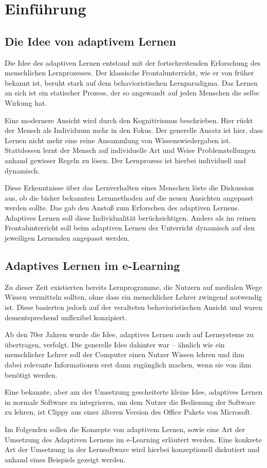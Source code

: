 \chapter{Einführung}

\section{Die Idee von adaptivem Lernen}
Die Idee des adaptiven Lernen entstand mit der fortschreitenden
Erforschung des menschlichen Lernprozesses.
Der klassische Frontalunterricht, wie er von früher bekannt ist,
beruht stark auf dem behavioristischen Lernparadigma.
Das Lernen an sich ist ein statischer Prozess, der so angewandt
auf jeden Menschen die selbe Wirkung hat.

Eine modernere Ansicht wird durch den Kognitivismus
beschrieben. Hier rückt der Mensch als Individuum mehr in den Fokus.
Der generelle Ansatz ist hier, dass Lernen nicht mehr eine reine
Ansammlung von Wissenswiedergaben ist. Stattdessen lernt der Mensch
auf individuelle Art und Weise Problemstellungen anhand gewisser Regeln zu lösen.
Der Lernprozess ist hierbei individuell und dynamisch.

Diese Erkenntnisse über das Lernverhalten eines Menschen löste die Diskussion aus,
ob die bisher bekannten Lernmethoden auf die neuen Ansichten angepasst werden sollte.
Das gab den Anstoß zum Erforschen des adaptiven Lernens.
Adaptives Lernen soll diese Individualität berücksichtigen.
Anders als im reinen Frontalunterricht soll beim adaptiven Lernen
der Unterricht dynamisch auf den jeweiligen Lernenden angepasst werden.

\section{Adaptives Lernen im e-Learning}
Zu dieser Zeit existierten bereits Lernprogramme, die Nutzern
auf medialen Wege Wissen vermitteln sollten, ohne dass ein menschlicher Lehrer
zwingend notwendig ist. Diese basierten jedoch auf der veralteten behavioristischen
Ansicht und waren dementsprechend unflexibel konzipiert.

Ab den 70er Jahren wurde die Idee, adaptives Lernen auch auf Lernsysteme
zu übertragen, verfolgt. Die generelle Idee dahinter war -- ähnlich wie ein
menschlicher Lehrer soll der Computer einen Nutzer Wissen lehren und
ihm dabei relevante Informationen erst dann zugänglich machen, wenn sie von ihm
benötigt werden.

Eine bekannte, aber am der Umsetzung gescheiterte kleine Idee, adaptives Lernen
in normale Software zu integrieren, um dem Nutzer die Bedienung der Software zu lehren,
ist \glqq Clippy\grqq{} aus einer älteren Version des Office Pakets von Microsoft.

Im Folgenden sollen die Konzepte von adaptivem Lernen, sowie eine Art der
Umsetzung des Adaptiven Lernens im e-Learning erläutert werden.
Eine konkrete Art der Umsetzung in der Lernsoftware wird hierbei konzeptionell
diskutiert und anhand eines Beispiels gezeigt werden.
